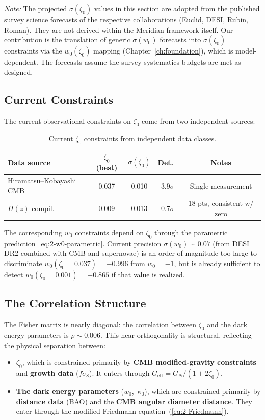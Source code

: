 \noindent\textit{Note:} The projected $\sigma(\zeta_0)$ values in this section are adopted from the published survey science forecasts of the respective collaborations (Euclid, DESI, Rubin, Roman). They are not derived within the Meridian framework itself. Our contribution is the translation of generic $\sigma(w_0)$ forecasts into $\sigma(\zeta_0)$ constraints via the $w_0(\zeta_0)$ mapping (Chapter~\ref{ch:foundation}), which is model-dependent. The forecasts assume the survey systematics budgets are met as designed.

\subsection{Current Constraints}
\label{sec:2-Fisher-current}

The current observational constraints on $\zeta_0$ come from two independent sources:

\begin{table}[htbp]
\centering
\caption{Current $\zeta_0$ constraints from independent data classes.}
\label{tab:2-Fisher-current}
\small
\begin{tabular}{lcccc}
\toprule
Data source & $\zeta_0$ (best) & $\sigma(\zeta_0)$ & Det.\ & Notes \\
\midrule
Hiramatsu--Kobayashi CMB & 0.037 & 0.010 & $3.9\sigma$ & Single measurement \\
$H(z)$ compil.\ & 0.009 & 0.013 & $0.7\sigma$ & 18 pts, consistent w/ zero \\
\bottomrule
\end{tabular}
\end{table}

The corresponding $w_0$ constraints depend on $\zeta_0$ through the parametric prediction~\eqref{eq:2-w0-parametric}. Current precision $\sigma(w_0) \sim 0.07$ (from DESI DR2 combined with CMB and supernovae) is an order of magnitude too large to discriminate $w_0(\zeta_0 = 0.037) = -0.996$ from $w_0 = -1$, but is already sufficient to detect $w_0(\zeta_0 = 0.001) = -0.865$ if that value is realized.

\subsection{The Correlation Structure}
\label{sec:2-Fisher-corr}

The Fisher matrix is nearly diagonal: the correlation between $\zeta_0$ and the dark energy parameters is $\rho \sim 0.006$. This near-orthogonality is structural, reflecting the physical separation between:
\begin{itemize}
    \item $\zeta_0$, which is constrained primarily by \textbf{CMB modified-gravity constraints} and \textbf{growth data} ($f\sigma_8$). It enters through $G_\mathrm{eff} = G_N/(1 + 2\zeta_0)$.

    \item \textbf{The dark energy parameters} ($w_0$,~$\kappa_0$), which are constrained primarily by \textbf{distance data} (BAO) and the \textbf{CMB angular diameter distance}. They enter through the modified Friedmann equation~(\ref{eq:2-Friedmann}).
\end{itemize}

